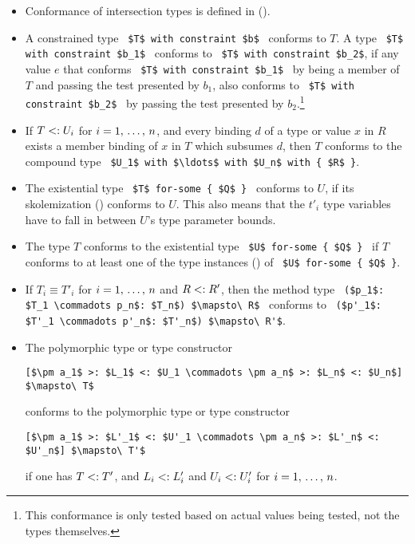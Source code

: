 \begin{itemize}
  \item Conformance of intersection types is defined in ().

  \item A constrained type ~\lstinline!$T$ with constraint $b$!~ conforms to $T$. A type ~\lstinline!$T$ with constraint $b_1$!~ conforms to ~\lstinline!$T$ with constraint $b_2$!, if any value $e$ that conforms ~\lstinline!$T$ with constraint $b_1$!~ by being a member of $T$ and passing the test presented by $b_1$, also conforms to ~\lstinline!$T$ with constraint $b_2$!~ by passing the test presented by $b_2$.\footnote{This conformance is only tested based on actual values being tested, not the types themselves.}

  \item If $T <: U_i$ for $i = 1 ,\, \ldots ,\, n$, and every binding $d$ of a type or value $x$ in $R$ exists a member binding of $x$ in $T$ which subsumes $d$, then $T$ conforms to the compound type ~\lstinline!$U_1$ with $\ldots$ with $U_n$ with { $R$ }!. 

  \item The existential type ~\lstinline!$T$ for-some { $Q$ }!~ conforms to $U$, if its skolemization () conforms to $U$. This also means that the $t'_i$ type variables have to fall in between $U$'s type parameter bounds. 

  \item The type $T$ conforms to the existential type ~\lstinline!$U$ for-some { $Q$ }!~ if $T$ conforms to at least one of the type instances () of ~\lstinline!$U$ for-some { $Q$ }!. 

  \item If $T_i \equiv T'_i$ for $i = 1 ,\, \ldots ,\, n$ and $R <: R'$, then the method type ~\lstinline!($p_1$: $T_1 \commadots p_n$: $T_n$) $\mapsto\ R$!~ conforms to ~\lstinline!($p'_1$: $T'_1 \commadots p'_n$: $T'_n$) $\mapsto\ R'$!. 

  \item The polymorphic type or type constructor 
\begin{lstlisting}
[$\pm a_1$ >: $L_1$ <: $U_1 \commadots \pm a_n$ >: $L_n$ <: $U_n$] $\mapsto\ T$
\end{lstlisting}
conforms to the polymorphic type or type constructor 
\begin{lstlisting}
[$\pm a_1$ >: $L'_1$ <: $U'_1 \commadots \pm a_n$ >: $L'_n$ <: $U'_n$] $\mapsto\ T'$
\end{lstlisting}
if one has $T <: T'$, and $L_i <: L'_i$ and $U_i <: U'_i$ for $i = 1 ,\, \ldots ,\, n$. 


\end{itemize}
